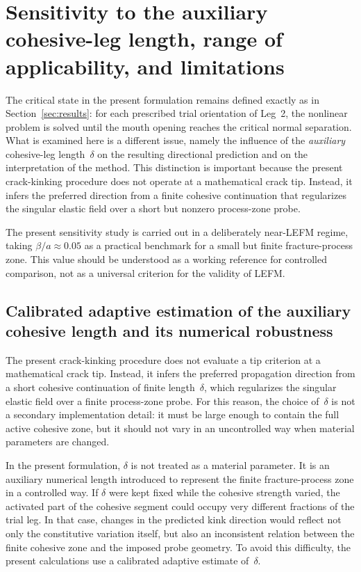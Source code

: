 \documentclass[smallextended]{svjour3}       %
\begin{document}
\section{Sensitivity to the auxiliary cohesive-leg length, range of applicability, and limitations}
\label{sec:scope_limitations}

The critical state in the present formulation remains defined exactly as in
Section~\ref{sec:results}: for each prescribed trial orientation of
Leg~2, the nonlinear problem is solved until the mouth opening reaches the
critical normal separation. What is examined here is a different issue,
namely the influence of the \emph{auxiliary} cohesive-leg length~$\delta$ on
the resulting directional prediction and on the interpretation of the method.
This distinction is important because the present crack-kinking procedure does
not operate at a mathematical crack tip. Instead, it infers the preferred
direction from a finite cohesive continuation that regularizes the singular
elastic field over a short but nonzero process-zone probe.

The present sensitivity study is carried out in a deliberately near-LEFM
regime, taking $\beta/a \approx 0.05$ as a practical benchmark for a small
but finite fracture-process zone. This value should be understood as a
working reference for controlled comparison, not as a universal criterion for
the validity of LEFM.

\subsection{Calibrated adaptive estimation of the auxiliary cohesive length and its numerical robustness}
\label{subsec:adaptive_delta}

The present crack-kinking procedure does not evaluate a tip criterion at a
mathematical crack tip. Instead, it infers the preferred propagation direction
from a short cohesive continuation of finite length~$\delta$, which
regularizes the singular elastic field over a finite process-zone probe. For
this reason, the choice of~$\delta$ is not a secondary implementation detail:
it must be large enough to contain the full active cohesive zone, but it
should not vary in an uncontrolled way when material parameters are changed.

In the present formulation, $\delta$ is not treated as a material parameter.
It is an auxiliary numerical length introduced to represent the finite
fracture-process zone in a controlled way. If $\delta$ were kept fixed while
the cohesive strength varied, the activated part of the cohesive segment could
occupy very different fractions of the trial leg. In that case, changes in the
predicted kink direction would reflect not only the constitutive variation
itself, but also an inconsistent relation between the finite cohesive zone and
the imposed probe geometry. To avoid this difficulty, the present calculations
use a calibrated adaptive estimate of~$\delta$.
\end{document}
